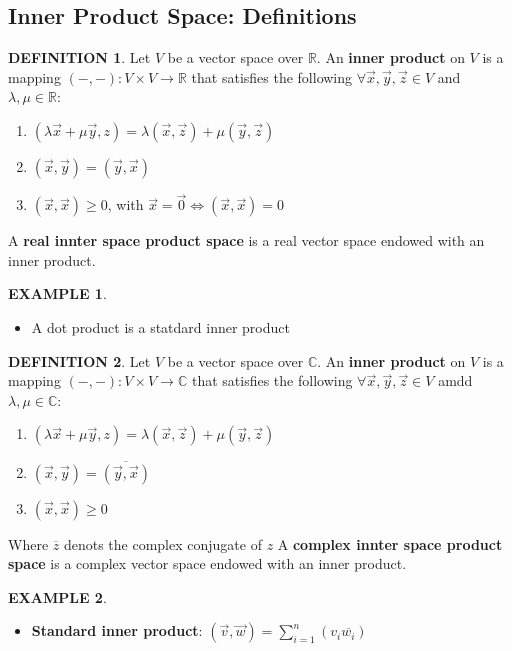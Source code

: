\documentclass[12pt]{article}
\theoremstyle{definition}
\newtheorem{definition}{DEFINITION}[subsection]
\newtheorem{example}{EXAMPLE}[subsection]
\begin{document}
\subsection{Inner Product Space: Definitions}
\begin{definition}
    Let $V$ be a vector space over $\mathbb{R}$. An \textbf{inner product} on $V$ is a mapping $(-,-): V \times V \rightarrow \mathbb{R}$ that satisfies the following $\forall \vec{x},\vec{y},\vec{z}\in V$ and $\lambda,\mu\in \mathbb{R}$:
    \begin{enumerate}
        \item $(\lambda\vec{x} + \mu\vec{y}, z) = \lambda(\vec{x},\vec{z}) + \mu(\vec{y},\vec{z})$
        \item $(\vec{x}, \vec{y}) = (\vec{y},\vec{x})$
        \item $(\vec{x},\vec{x}) \geq 0$, with $\vec{x} = \vec{0} \Leftrightarrow (\vec{x},\vec{x}) = 0$
    \end{enumerate} 
    A \textbf{real innter space product space} is a real vector space endowed with an inner product.
\end{definition}

\begin{example}
    \quad
    \begin{itemize}
        \item A dot product is a statdard inner product
    \end{itemize}
\end{example}

\begin{definition}
    Let $V$ be a vector space over $\mathbb{C}$. An \textbf{inner product} on $V$ is a mapping $(-,-): V \times V \rightarrow \mathbb{C}$ that satisfies the following $\forall \vec{x},\vec{y},\vec{z}\in V$ amdd $\lambda,\mu\in \mathbb{C}$:
    \begin{enumerate}
        \item $(\lambda\vec{x} + \mu\vec{y}, z) = \lambda(\vec{x},\vec{z}) + \mu(\vec{y},\vec{z})$
        \item $(\vec{x}, \vec{y}) = \overline{(\vec{y},\vec{x})}$
        \item $(\vec{x},\vec{x}) \geq 0$
    \end{enumerate} 
    Where $\overline{z}$ denots the complex conjugate of $z$ A \textbf{complex innter space product space} is a complex vector space endowed with an inner product.
\end{definition}

\begin{example}
    \quad
    \begin{itemize}
        \item \textbf{Standard inner product}: $(\vec{v},\vec{w}) = \sum_{i=1}^n(v_i \overline{w_i})$
    \end{itemize}
\end{example}
\end{document}
